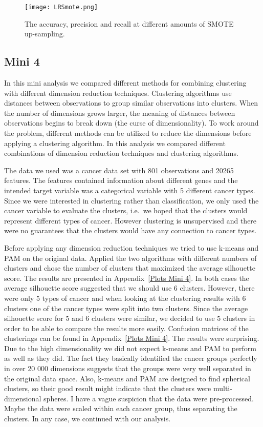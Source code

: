 \documentclass[11pt,twoside,swedish]{article}
\begin{document}
\begin{figure}[!ht]
\begin{center}
\texttt{[image: LRSmote.png]}
\caption{The accuracy, precision and recall at different amounts of
  SMOTE up-sampling.}
\label{mini 3 smote}
\end{center}
\end{figure}

\newpage
\subsection{Mini 4}\label{Mini 4}

In this mini analysis we compared different methods for combining
clustering with different dimension reduction techniques. Clustering
algorithms use distances between observations to group similar
observations into clusters. When the number of dimensions grows larger,
the meaning of distances between observations begins to break down
(the curse of dimensionality). To work around the problem, different
methods can be utilized to reduce the dimensions before applying a
clustering algorithm. In this analysis we compared different
combinations of dimension reduction techniques and clustering
algorithms.

The data we used was a cancer data set with 801 observations and 20265
features. The features contained information about different genes and
the intended target variable was a categorical variable with 5
different cancer types. Since we were interested in clustering rather
than classification, we only used the cancer variable to evaluate the
clusters, i.e.\ we hoped that the clusters would represent different
types of cancer. However clustering is unsupervised and there were no
guarantees that the clusters would have any connection to cancer
types.

Before applying any dimension reduction techniques we tried to use
k-means and PAM on the original data. Applied the two algorithms with
different numbers of clusters and chose the number of clusters that
maximized the average silhouette score. The results are presented in
Appendix~\ref{Plots Mini 4}. In both cases the average silhouette
score suggested that we should use 6 clusters. However, there were
only 5 types of cancer and when looking at the clustering results with
6 clusters one of the cancer types were split into two clusters. Since
the average silhouette score for 5 and 6 clusters were similar, we
decided to use 5 clusters in order to be able to compare the results
more easily. Confusion matrices of the clusterings can be found in
Appendix~\ref{Plots Mini 4}. The results were surprising. Due to the
high dimensionality we did not expect k-means and PAM to perform as
well as they did. The fact they basically identified the cancer groups
perfectly in over 20 000 dimensions suggests that the groups were very
well separated in the original data space. Also, k-means and PAM are
designed to find spherical clusters, so their good result might
indicate that the clusters were multi-dimensional spheres. I have a
vague suspicion that the data were pre-processed. Maybe the data were
scaled within each cancer group, thus separating the clusters. In any
case, we continued with our analysis.
\end{document}
